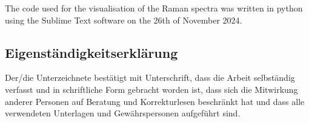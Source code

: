 The code used for the visualisation of the Raman spectra was written in python using the Sublime Text software on the 26th of November 2024.
\\



\subsection*{Eigenständigkeitserklärung}

Der/die Unterzeichnete bestätigt mit Unterschrift, dass die Arbeit selbständig verfasst und in schriftliche Form gebracht worden ist, dass sich die Mitwirkung anderer Personen auf Beratung und Korrekturlesen beschränkt hat und dass alle verwendeten Unterlagen und Gewährspersonen aufgeführt sind.